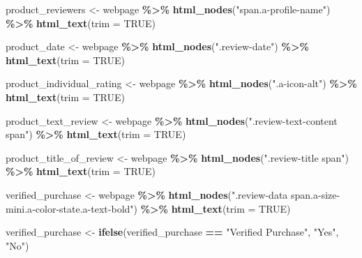 \documentclass[
  11pt,
]{article}
\newenvironment{Shaded}{\begin{snugshade}}{\end{snugshade}}
\newcommand{\AttributeTok}[1]{\textcolor[rgb]{0.13,0.29,0.53}{#1}}
\newcommand{\ConstantTok}[1]{\textcolor[rgb]{0.56,0.35,0.01}{#1}}
\newcommand{\FunctionTok}[1]{\textcolor[rgb]{0.13,0.29,0.53}{\textbf{#1}}}
\newcommand{\NormalTok}[1]{#1}
\newcommand{\OtherTok}[1]{\textcolor[rgb]{0.56,0.35,0.01}{#1}}
\newcommand{\SpecialCharTok}[1]{\textcolor[rgb]{0.81,0.36,0.00}{\textbf{#1}}}
\newcommand{\StringTok}[1]{\textcolor[rgb]{0.31,0.60,0.02}{#1}}
\begin{document}
\begin{Shaded}
\begin{Highlighting}[]
\NormalTok{  product\_reviewers }\OtherTok{\textless{}{-}}\NormalTok{ webpage }\SpecialCharTok{\%\textgreater{}\%}
    \FunctionTok{html\_nodes}\NormalTok{(}\StringTok{"span.a{-}profile{-}name"}\NormalTok{) }\SpecialCharTok{\%\textgreater{}\%}
    \FunctionTok{html\_text}\NormalTok{(}\AttributeTok{trim =} \ConstantTok{TRUE}\NormalTok{)}
  
\NormalTok{  product\_date }\OtherTok{\textless{}{-}}\NormalTok{ webpage }\SpecialCharTok{\%\textgreater{}\%} 
    \FunctionTok{html\_nodes}\NormalTok{(}\StringTok{".review{-}date"}\NormalTok{) }\SpecialCharTok{\%\textgreater{}\%}
    \FunctionTok{html\_text}\NormalTok{(}\AttributeTok{trim =} \ConstantTok{TRUE}\NormalTok{)}
  
\NormalTok{  product\_individual\_rating }\OtherTok{\textless{}{-}}\NormalTok{ webpage }\SpecialCharTok{\%\textgreater{}\%}
    \FunctionTok{html\_nodes}\NormalTok{(}\StringTok{".a{-}icon{-}alt"}\NormalTok{) }\SpecialCharTok{\%\textgreater{}\%}
    \FunctionTok{html\_text}\NormalTok{(}\AttributeTok{trim =} \ConstantTok{TRUE}\NormalTok{)}
  
\NormalTok{  product\_text\_review }\OtherTok{\textless{}{-}}\NormalTok{ webpage }\SpecialCharTok{\%\textgreater{}\%}
    \FunctionTok{html\_nodes}\NormalTok{(}\StringTok{".review{-}text{-}content span"}\NormalTok{) }\SpecialCharTok{\%\textgreater{}\%}
    \FunctionTok{html\_text}\NormalTok{(}\AttributeTok{trim =} \ConstantTok{TRUE}\NormalTok{)}
  
\NormalTok{  product\_title\_of\_review }\OtherTok{\textless{}{-}}\NormalTok{ webpage }\SpecialCharTok{\%\textgreater{}\%}
    \FunctionTok{html\_nodes}\NormalTok{(}\StringTok{".review{-}title span"}\NormalTok{) }\SpecialCharTok{\%\textgreater{}\%}
    \FunctionTok{html\_text}\NormalTok{(}\AttributeTok{trim =} \ConstantTok{TRUE}\NormalTok{)}
  
\NormalTok{  verified\_purchase }\OtherTok{\textless{}{-}}\NormalTok{ webpage }\SpecialCharTok{\%\textgreater{}\%}
    \FunctionTok{html\_nodes}\NormalTok{(}\StringTok{".review{-}data span.a{-}size{-}mini.a{-}color{-}state.a{-}text{-}bold"}\NormalTok{) }\SpecialCharTok{\%\textgreater{}\%}
    \FunctionTok{html\_text}\NormalTok{(}\AttributeTok{trim =} \ConstantTok{TRUE}\NormalTok{)}
  
\NormalTok{  verified\_purchase }\OtherTok{\textless{}{-}} \FunctionTok{ifelse}\NormalTok{(verified\_purchase }\SpecialCharTok{==} \StringTok{"Verified Purchase"}\NormalTok{, }\StringTok{"Yes"}\NormalTok{, }\StringTok{"No"}\NormalTok{)}
  

\end{Highlighting}
\end{Shaded}
\end{document}
